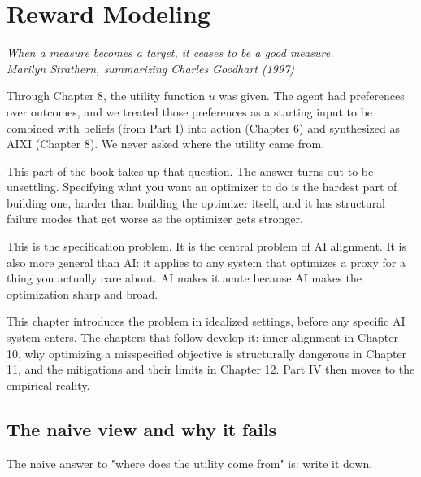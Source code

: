 \chapter{Reward Modeling}

\vspace{1em}
\hfill
\begin{minipage}[c]{0.55\textwidth}
\raggedleft
\small\itshape
When a measure becomes a target, it ceases to be a good measure.\\[0.5em]
\upshape\footnotesize Marilyn Strathern, summarizing Charles Goodhart (1997)
\end{minipage}%
\hspace{0.5em}
\begin{minipage}[c]{0.12\textwidth}
\end{minipage}
\vspace{1.5em}

\noindent Through Chapter 8, the utility function $u$ was given. The agent had preferences over outcomes, and we treated those preferences as a starting input to be combined with beliefs (from Part I) into action (Chapter 6) and synthesized as AIXI (Chapter 8). We never asked where the utility came from.

This part of the book takes up that question. The answer turns out to be unsettling. Specifying what you want an optimizer to do is the hardest part of building one, harder than building the optimizer itself, and it has structural failure modes that get worse as the optimizer gets stronger.

This is the specification problem. It is the central problem of AI alignment. It is also more general than AI: it applies to any system that optimizes a proxy for a thing you actually care about. AI makes it acute because AI makes the optimization sharp and broad.

This chapter introduces the problem in idealized settings, before any specific AI system enters. The chapters that follow develop it: inner alignment in Chapter 10, why optimizing a misspecified objective is structurally dangerous in Chapter 11, and the mitigations and their limits in Chapter 12. Part IV then moves to the empirical reality.

\section*{The naive view and why it fails}

The naive answer to "where does the utility come from" is: write it down.

